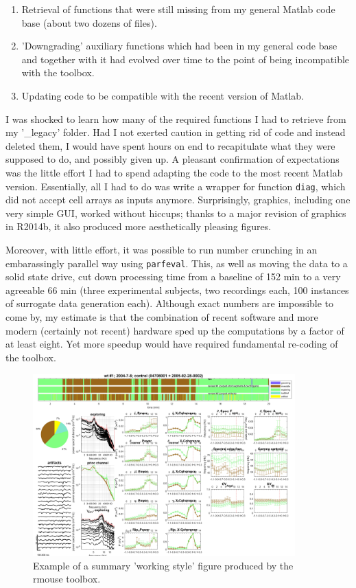 \begin{enumerate}
	\item Retrieval of functions that were still missing from my general Matlab code base (about two dozens of files).
	\item 'Downgrading' auxiliary functions which had been in my general code base and together with it had evolved over time to the point of being incompatible with the toolbox.
	\item Updating code to be compatible with the recent version of Matlab.
\end{enumerate}

I was shocked to learn how many of the required functions I had to retrieve from my '\_legacy' folder. Had I not exerted caution in getting rid of code and instead deleted them, I would have spent hours on end to recapitulate what they were supposed to do, and possibly given up. A pleasant confirmation of expectations was the little effort I had to spend adapting the code to the most recent Matlab version. Essentially, all I had to do was write a wrapper for function \texttt{diag}, which did not accept cell arrays as inputs anymore. Surprisingly, graphics, including one very simple GUI, worked without hiccups; thanks to a major revision of graphics in R2014b, it also produced more aesthetically pleasing figures. 

Moreover, with little effort, it was possible to run number crunching in an embarassingly parallel way using \texttt{parfeval}. This, as well as moving the data to a solid state drive, cut down processing time from a baseline of 152 min to a very agreeable 66 min (three experimental subjects, two recordings each, 100 instances of surrogate data generation each). Although exact numbers are impossible to come by, my estimate is that the combination of recent software and more modern (certainly not recent) hardware sped up the computations by a factor of at least eight. Yet more speedup would have required fundamental re-coding of the toolbox.

\begin{figure}
	\centering
	\includegraphics[width=0.9\textwidth]{figures/example_summaryFig_rmouse.jpg}
	\caption{Example of a summary 'working style' figure produced by the rmouse toolbox.}
	\label{fig:rmouse_workingstyle}
\end{figure}

